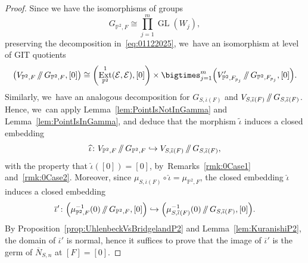 \documentclass[JEP,XML,SOM,Unicode,published]{cedram}
\newcommand\hto{\mathrel{\lhook\joinrel\to}}
\providecommand\sslash{\mathop{/\mkern-5.5mu/}}
\newcommand{\PP}{{\mathbb P}}\let\P\PP
\newcommand\cE{\mathcal{E}}
\DeclareMathOperator{\Ext}{Ext}
\DeclareMathOperator{\GL}{GL}
\let\wh\widehat
\theoremstyle{definition}
\begin{document}
\begin{proof}
Since we have the isomorphisms of groups
\[
G_{\PP^2,F}\cong\prod_{j=1}^m\GL(W_j),
\]
preserving the decomposition in~\eqref{eq:01122025}, we~have an isomorphism at level of GIT quotients
\[
\left(V_{\PP^2,F}\sslash G_{\P^2,F},[0]\right)\cong\left(\Ext^1_{\PP^2}(\cE,\cE),[0]\right)\times\bigtimes_{j=1}^m \Bigl(V_{\PP^2,F_{p_j}}'\sslash G_{\P^2,F_{p_j}},[0]\Bigr).
\]
Similarly, we~have an analogous decomposition for $G_{S,\overline{\iota}(F)}$ and $V_{S,\overline{\iota}(F)}\sslash G_{S,\overline{\iota}(F)}$.
Hence, we~can apply Lemma~\ref{lem:PointIsNotInGamma} and Lemma~\ref{lem:PointIsInGamma}, and deduce that the morphism $\widetilde{\iota}$ induces a closed embedding
\[
\widehat{\iota}\colon V_{\PP^2,F}\sslash G_{\P^2,F} \hto V_{S,\overline{\iota}(F)}\sslash G_{S,\overline{\iota}(F)},
\]
with the property that $\widehat{\iota}([0])=[0]$, by~Remarks~\ref{rmk:0Case1} and~\ref{rmk:0Case2}.
Moreover, since $\mu_{S,\overline{\iota}(F)}\circ\widehat{\iota}=\mu_{\PP^2,F}$, the closed embedding $\wh{\iota}$ induces a closed embedding
\[
\overline{\iota}'\colon \Bigl(\mu_{\PP^2,F}^{-1}(0)\sslash G_{\P^2,F},[0] \Bigr) \hto \Bigl(\mu_{S,\overline{\iota}(F)}^{-1}(0)\sslash G_{S,\overline{\iota}(F)},[0] \Bigr).
\]
By Proposition~\ref{prop:UhlenbeckVsBridgelandP2} and Lemma~\ref{lem:KuranishiP2}, the domain of $\overline{\iota}'$ is normal, hence it suffices to prove that the image of $\overline{\iota}'$ is the germ of $ \overline{N}_{S,n}$ at $[F]=[0]$.


\end{proof}
\end{document}

